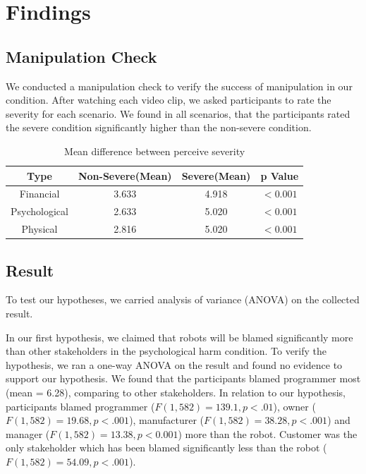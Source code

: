 \documentclass{sigchi}
\begin{document}
\section{Findings}
\subsection{Manipulation Check}
We conducted a manipulation check to verify the success of manipulation in our condition. After watching each video clip, we asked participants to rate the severity for each scenario. We found in all scenarios, that the participants rated the severe condition significantly higher than the non-severe condition.

\begin{table}
  \centering
  \begin{tabular}{|c|c|c|c|}
    \hline
    Type & Non-Severe(Mean) & Severe(Mean) & p Value \\
    \hline
    Financial & 3.633 & 4.918 & $ < 0.001$ \\
    \hline
    Psychological & 2.633 & 5.020 & $ < 0.001$ \\
    \hline
    Physical & 2.816 & 5.020 & $ < 0.001$ \\
    \hline
  \end{tabular}
  \caption{Mean difference between perceive severity}
  \label{tab:table1}
\end{table}

\subsection{Result}
To test our hypotheses, we carried analysis of variance (ANOVA) on the collected result. 

In our first hypothesis, we claimed that robots will be blamed significantly more than other stakeholders in the psychological harm condition. To verify the hypothesis, we ran a one-way ANOVA on the result and found no evidence to support our hypothesis. We found that the participants blamed programmer most (mean = 6.28), comparing to other stakeholders. In relation to our hypothesis, participants blamed programmer ($ F(1,582) =139.1, p < .01$), owner ($ F(1,582) = 19.68, p < .001$), manufacturer ($F(1,582) = 38.28, p < .001$) and manager ($F(1,582) = 13.38, p < 0.001$) more than the robot. Customer was the only stakeholder which has been blamed significantly less than the robot ($F(1,582) = 54.09, p < .001$).
\end{document}
